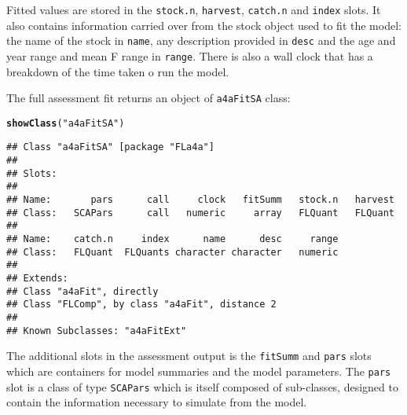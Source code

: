 \documentclass[a4paper,english,10pt]{article}\usepackage[]{graphicx}\usepackage[]{color}
\makeatletter
\newcommand{\hlstr}[1]{\textcolor[rgb]{0.192,0.494,0.8}{#1}}%
\newcommand{\hlstd}[1]{\textcolor[rgb]{0.345,0.345,0.345}{#1}}%
\newcommand{\hlkwd}[1]{\textcolor[rgb]{0.737,0.353,0.396}{\textbf{#1}}}%
\newenvironment{kframe}{%
 \def\at@end@of@kframe{}%
 \ifinner\ifhmode%
  \def\at@end@of@kframe{\end{minipage}}%
  \begin{minipage}{\columnwidth}%
 \fi\fi%
 \def\FrameCommand##1{\hskip\@totalleftmargin \hskip-\fboxsep
 \colorbox{shadecolor}{##1}\hskip-\fboxsep
     \hskip-\linewidth \hskip-\@totalleftmargin \hskip\columnwidth}%
 \MakeFramed {\advance\hsize-\width
   \@totalleftmargin\z@ \linewidth\hsize
   \@setminipage}}%
 {\par\unskip\endMakeFramed%
 \at@end@of@kframe}
\newenvironment{knitrout}{}{} %
\makeatother
\begin{document}
Fitted values are stored in the \texttt{stock.n}, \texttt{harvest}, \texttt{catch.n} and \texttt{index} slots.  It also contains information carried over from the stock object used to fit the model: the name of the stock in \texttt{name}, any description provided in \texttt{desc} and the age and year range and mean F range in \texttt{range}.  There is also a wall clock that has a breakdown of the time taken o run the model.

The full assessment fit returns an object of \texttt{a4aFitSA} class:

\begin{knitrout}
\color{fgcolor}\begin{kframe}
\begin{alltt}
\hlkwd{showClass}\hlstd{(}\hlstr{"a4aFitSA"}\hlstd{)}
\end{alltt}
\begin{verbatim}
## Class "a4aFitSA" [package "FLa4a"]
## 
## Slots:
##                                                                   
## Name:       pars      call     clock   fitSumm   stock.n   harvest
## Class:   SCAPars      call   numeric     array   FLQuant   FLQuant
##                                                         
## Name:    catch.n     index      name      desc     range
## Class:   FLQuant  FLQuants character character   numeric
## 
## Extends: 
## Class "a4aFit", directly
## Class "FLComp", by class "a4aFit", distance 2
## 
## Known Subclasses: "a4aFitExt"
\end{verbatim}
\end{kframe}
\end{knitrout}


The additional slots in the assessment output is the \texttt{fitSumm} and \texttt{pars} slots which are containers for model summaries and the model parameters.  The \texttt{pars} slot is a class of type \texttt{SCAPars} which is itself composed of sub-classes, designed to contain the information necessary to simulate from the model.
\end{document}

